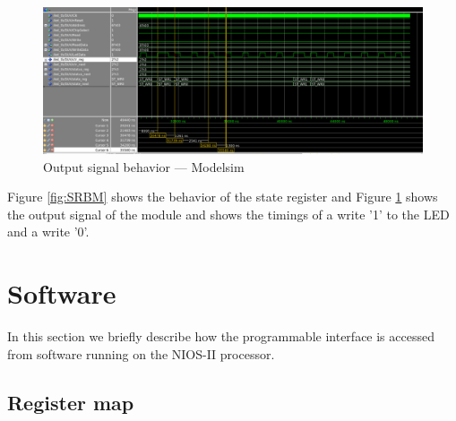 \documentclass{article}
\begin{document}
\begin{figure}[H]
    \centering
    \includegraphics[width=\textwidth]{modelsim_leddata}
    \caption{Output signal behavior --- Modelsim}
    \label{fig:OSBM}
\end{figure}

Figure \ref{fig:SRBM} shows the behavior of the state register and Figure \ref{fig:OSBM} shows the output signal of the module and shows the timings of a write '1' to the LED and a write '0'.

\section{Software}

In this section we briefly describe how the programmable interface is accessed from software running on the NIOS-II processor.

\subsection{Register map}
\end{document}
